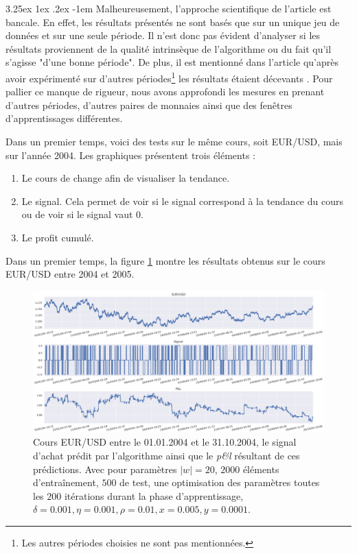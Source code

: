 \documentclass[a4paper, 11pt]{article}
\makeatletter
\renewcommand\paragraph{\@startsection{paragraph}{5}{\z@}%
  {3.25ex \@plus1ex \@minus.2ex}%
  {-1em}%
  {\normalfont\normalsize\bfseries}}
\makeatother
\begin{document}
 \paragraph{}
 Malheureusement, l'approche scientifique de l'article est bancale. En effet, les résultats présentés ne sont basés que sur un unique jeu de données et sur une seule période. Il n'est donc pas évident d'analyser si les résultats proviennent de la qualité intrinsèque de l'algorithme ou du fait qu'il s'agisse "d'une bonne période". De plus, il est mentionné dans l'article qu'après avoir expérimenté sur d'autres périodes\footnote{Les autres périodes choisies ne sont pas mentionnées.} les résultats étaient décevants \cite{fx_trading}. Pour pallier ce manque de rigueur, nous avons approfondi les mesures en prenant d'autres périodes, d'autres paires de monnaies ainsi que des fenêtres d'apprentissages différentes.
 
 Dans un premier temps, voici des tests sur le même cours, soit EUR/USD, mais sur l'année 2004.
 Les graphiques présentent trois éléments :
 \begin{enumerate}
  \item Le cours de change afin de visualiser la tendance.
  \item Le signal. Cela permet de voir si le signal correspond à la tendance du cours ou de voir si le signal vaut 0.
  \item Le profit cumulé.
 \end{enumerate}

Dans un premier temps, la figure \ref{eurusd 2004 2005} montre les résultats obtenus sur le cours EUR/USD entre 2004 et 2005.
 \begin{figure}
\centering
\includegraphics[scale=0.5]{res/eurusd_2004-2005}
\caption{Cours EUR/USD entre le 01.01.2004 et le 31.10.2004, le signal d'achat prédit par l'algorithme ainsi que le \textit{p\&l} résultant de ces prédictions. Avec pour paramètres $|w| = 20$, $2000$ éléments d'entraînement, $500$ de test, une optimisation des
paramètres toutes les $200$ itérations durant la phase d'apprentissage, $\delta = 0.001, \eta=0.001,\rho=0.01, x = 0.005, y=0.0001$.}
\label{eurusd 2004 2005}
\end{figure}
\end{document}
